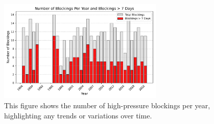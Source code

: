 \begin{figure}[H]
    \centering
    \includegraphics[width=0.7\textwidth]{Figures/BlockingsPerYear.pdf}
    \caption{This figure shows the number of high-pressure blockings per year, highlighting any trends or variations over time.}
    \label{fig:blockings}
\end{figure}




